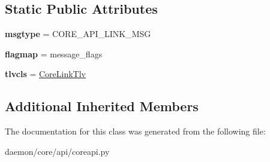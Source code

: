 \subsection*{Static Public Attributes}
\begin{DoxyCompactItemize}
\item 
\hypertarget{classcore_1_1api_1_1coreapi_1_1_core_link_message_ab17a827677cdf8f222ea380fdfe707ba}{{\bfseries msgtype} = C\+O\+R\+E\+\_\+\+A\+P\+I\+\_\+\+L\+I\+N\+K\+\_\+\+M\+S\+G}\label{classcore_1_1api_1_1coreapi_1_1_core_link_message_ab17a827677cdf8f222ea380fdfe707ba}

\item 
\hypertarget{classcore_1_1api_1_1coreapi_1_1_core_link_message_a4c8478d500a600901e6073320b82d5b5}{{\bfseries flagmap} = message\+\_\+flags}\label{classcore_1_1api_1_1coreapi_1_1_core_link_message_a4c8478d500a600901e6073320b82d5b5}

\item 
\hypertarget{classcore_1_1api_1_1coreapi_1_1_core_link_message_a08b5605d9344a535de5fbcb8c27256b7}{{\bfseries tlvcls} = \hyperlink{classcore_1_1api_1_1coreapi_1_1_core_link_tlv}{Core\+Link\+Tlv}}\label{classcore_1_1api_1_1coreapi_1_1_core_link_message_a08b5605d9344a535de5fbcb8c27256b7}

\end{DoxyCompactItemize}
\subsection*{Additional Inherited Members}


The documentation for this class was generated from the following file\+:\begin{DoxyCompactItemize}
\item 
daemon/core/api/coreapi.\+py\end{DoxyCompactItemize}
